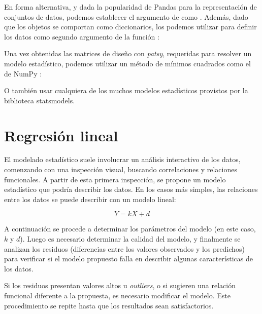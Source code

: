 
En forma alternativa, y dada la popularidad de Pandas para la representación de conjuntos de datos, podemos establecer el argumento  de  como . Además, dado que los objetos  se comportan como diccionarios, los podemos utilizar para definir los datos como segundo argumento de la función :


Una vez obtenidas las matrices de diseño con \textit{patsy}, requeridas para resolver un modelo estadístico, podemos utilizar un método de mínimos cuadrados como el de NumPy :

O también usar cualquiera de los muchos modelos estadísticos provistos por la biblioteca statsmodels.

\section{Regresión lineal}
El modelado estadístico suele involucrar un análisis interactivo de los datos, comenzando con una inspección visual, buscando correlaciones y relaciones funcionales. A partir de esta primera inspección, se propone un modelo estadístico que podría describir los datos. En los casos más simples, las relaciones entre los datos se puede describir con un modelo lineal:

\[ Y = k X + d \]

A continuación se procede a determinar los parámetros del modelo (en este caso, $k$ y $d$). Luego es necesario determinar la calidad del modelo, y finalmente se analizan los residuos (diferencias entre los valores observados y los predichos) para verificar si el modelo propuesto falla en describir algunas características de los datos.

Si los residuos presentan valores altos u \textit{outliers}, o si sugieren una relación funcional diferente a la propuesta, es necesario modificar el modelo. Este procedimiento se repite hasta que los resultados sean satisfactorios.


